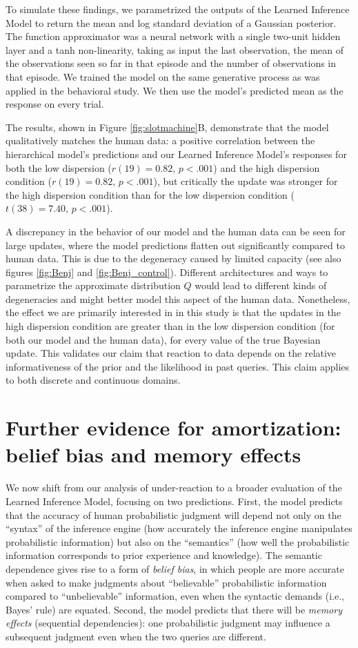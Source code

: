 To simulate these findings, we parametrized the outputs of the Learned Inference Model to return the mean and log standard deviation of a Gaussian posterior. The function approximator was a neural network with a single two-unit hidden layer and a tanh non-linearity, taking as input the last observation, the mean of the observations seen so far in that episode and the number of observations in that episode. We trained the model on the same generative process as was applied in the behavioral study. We then use the model's predicted mean as the response on every trial.

The results, shown in Figure \ref{fig:slotmachine}B, demonstrate that the model qualitatively matches the human data: a positive correlation between the hierarchical model's predictions and our Learned Inference Model's responses for both the low dispersion ($r(19)=0.82$, $p<.001$) and the high dispersion condition ($r(19)=0.82$, $p<.001$), but critically the update was stronger for the high dispersion condition than for the low dispersion condition ($t(38)=7.40$, $p<.001$).

A discrepancy in the behavior of our model and the human data can be seen for large updates, where the model predictions flatten out significantly compared to human data. This is due to the degeneracy caused by limited capacity (see also figures \ref{fig:Benj} and \ref{fig:Benj_control}). Different architectures and ways to parametrize the approximate distribution $Q$ would lead to different kinds of degeneracies and might better model this aspect of the human data. Nonetheless, the effect we are primarily interested in in this study is that the updates in the high dispersion condition are greater than in the low dispersion condition (for both our model and the human data), for every value of the true Bayesian update. This validates our claim that reaction to data depends on the relative informativeness of the prior and the likelihood in past queries. This claim applies to both discrete and continuous domains.

\section{Further evidence for amortization: belief bias and memory effects}

We now shift from our analysis of under-reaction to a broader evaluation of the Learned Inference Model, focusing on two predictions. First, the model predicts that the accuracy of human probabilistic judgment will depend not only on the ``syntax'' of the inference engine (how accurately the inference engine manipulates probabilistic information) but also on the ``semantics'' (how well the probabilistic information corresponds to prior experience and knowledge). The semantic dependence gives rise to a form of \emph{belief bias}, in which people are more accurate when asked to make judgments about ``believable'' probabilistic information compared to ``unbelievable'' information, even when the syntactic demands (i.e., Bayes' rule) are equated. Second, the model predicts that there will be \emph{memory effects} (sequential dependencies): one probabilistic judgment may influence a subsequent judgment even when the two queries are different. 

